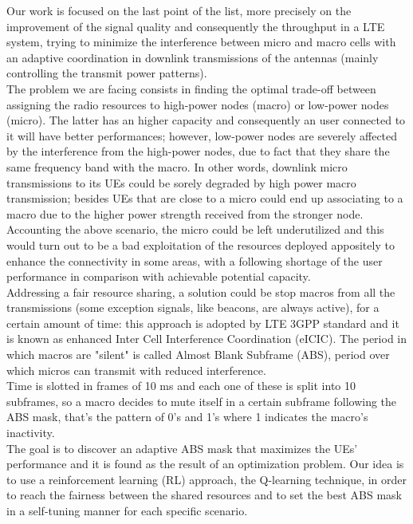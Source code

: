 \documentclass[conference,10pt]{IEEEtran}
\begin{document}
Our work is focused on the last point of the list, more precisely on the improvement of the signal quality and consequently the throughput in a LTE system, trying to minimize the interference between micro and macro cells with an adaptive coordination in downlink transmissions of the antennas (mainly controlling the transmit power patterns).\\
The problem we are facing consists in finding the optimal trade-off between assigning the radio resources to high-power nodes (macro) or low-power nodes (micro). The latter has an higher capacity and consequently an user connected to it will have better performances; however, low-power nodes are severely affected by the interference from the high-power nodes, due to fact that they share the same frequency band with the macro. In other words, downlink micro transmissions to its UEs could be sorely degraded by high power macro transmission; besides UEs that are close to a micro could end up associating to a macro due to the higher power strength received from the stronger node.\\
Accounting the above scenario, the micro could be left underutilized and this would turn out to be a bad exploitation of the resources deployed appositely to enhance the connectivity in some areas, with a following shortage of the user performance in comparison with achievable potential capacity.\\
Addressing a fair resource sharing, a solution could be stop macros from all the transmissions (some exception signals, like beacons, are always active), for a certain amount of time: this approach is adopted by LTE 3GPP standard and it is known as enhanced Inter Cell Interference Coordination (eICIC). The period in which macros are "silent" is called Almost Blank Subframe (ABS), period over which micros can transmit with reduced interference.\\
Time is slotted in frames of 10 ms and each one of these is split into 10 subframes, so a macro decides to mute itself in a certain subframe following the ABS mask, that's the pattern of 0's and 1's where 1 indicates the macro's inactivity.\\
The goal is to discover an adaptive ABS mask that maximizes the UEs' performance and it is found as the result of an optimization problem. Our idea is to use a reinforcement learning (RL) approach, the Q-learning technique, in order to reach the fairness between the shared resources and to set the best ABS mask in a self-tuning manner for each specific scenario.\\
\end{document}
